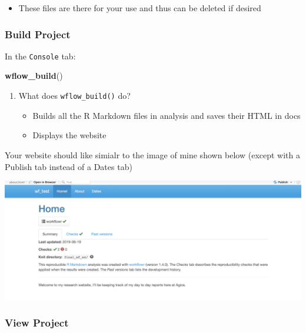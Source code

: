 \documentclass[]{book}
\newenvironment{Shaded}{\begin{snugshade}}{\end{snugshade}}
\newcommand{\KeywordTok}[1]{\textcolor[rgb]{0.13,0.29,0.53}{\textbf{#1}}}
\newcommand{\NormalTok}[1]{#1}
\providecommand{\tightlist}{%
  \setlength{\itemsep}{0pt}\setlength{\parskip}{0pt}}
\begin{document}
\begin{enumerate}
  \begin{itemize}
  \tightlist
  \item
    These files are there for your use and thus can be deleted if desired
  \end{itemize}
\end{enumerate}

\hypertarget{build-project}{%
\subsubsection{Build Project}\label{build-project}}

In the \texttt{Console} tab:

\begin{Shaded}
\begin{Highlighting}[]
\KeywordTok{wflow_build}\NormalTok{()}
\end{Highlighting}
\end{Shaded}

\begin{enumerate}
\def\labelenumi{\arabic{enumi}.}
\tightlist
\item
  What does \texttt{wflow\_build()} do?

  \begin{itemize}
  \tightlist
  \item
    Builds all the R Markdown files in analysis and saves their HTML in docs
  \item
    Displays the website
  \end{itemize}
\end{enumerate}

Your website should like simialr to the image of mine shown below (except with a Publish tab instead of a Dates tab)

\begin{center}\includegraphics[width=0.9\linewidth]{images/Workflow_Photos/sample_wf} \end{center}

\hypertarget{view-project}{%
\subsubsection{View Project}\label{view-project}}
\end{document}
